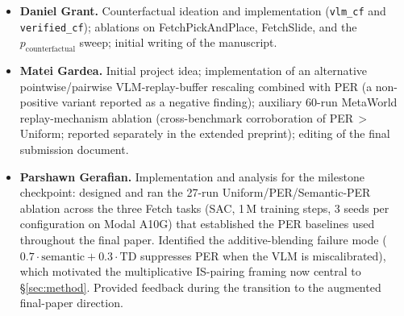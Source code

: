 \documentclass{article}
\begin{document}
\begin{itemize}\itemsep0pt
\item \textbf{Daniel Grant.} Counterfactual ideation and
  implementation (\texttt{vlm\_cf} and \texttt{verified\_cf});
  ablations on FetchPickAndPlace, FetchSlide, and the
  $p_{\text{counterfactual}}$ sweep; initial writing of the
  manuscript.
\item \textbf{Matei Gardea.} Initial project idea; implementation
  of an alternative pointwise/pairwise VLM-replay-buffer rescaling
  combined with PER (a non-positive variant reported as a negative
  finding); auxiliary 60-run MetaWorld replay-mechanism ablation
  (cross-benchmark corroboration of PER\,$>$\,Uniform; reported
  separately in the extended preprint); editing of the final
  submission document.
\item \textbf{Parshawn Gerafian.} Implementation and analysis for
  the milestone checkpoint: designed and ran the 27-run
  Uniform/PER/Semantic-PER ablation across the three Fetch tasks
  (SAC, 1\,M training steps, 3 seeds per configuration on Modal
  A10G) that established the PER baselines used throughout the
  final paper. Identified the additive-blending failure mode
  ($0.7 \cdot \text{semantic} + 0.3 \cdot \text{TD}$ suppresses
  PER when the VLM is miscalibrated), which motivated the
  multiplicative IS-pairing framing now central to
  \S\ref{sec:method}. Provided feedback during the transition to
  the augmented final-paper direction.
\end{itemize}




\appendix


\end{document}
